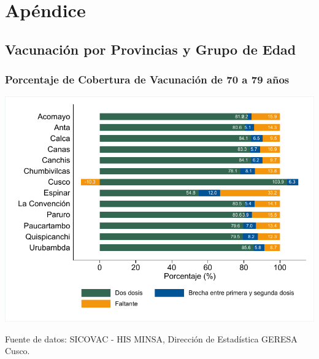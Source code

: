 \documentclass[xcolor=table]{beamer}
\begin{document}
\appendix
\section{Apéndice}

\subsection{Vacunación por Provincias y Grupo de Edad}

\begin{frame}[label=vacunas_70]
	\frametitle{Porcentaje de Cobertura de Vacunación de 70 a 79 años}
	\vspace{-.5cm}
	\begin{center}
		\includegraphics[width=0.8\linewidth, trim={.2cm .5cm .2cm .2cm},clip]{../figuras/vacunacion_provincial_edad_8.pdf}
	\end{center}
	{\tiny Fuente de datos: SICOVAC - HIS MINSA, Dirección de Estadística GERESA Cusco. \\}
\hyperlink{cobertura_vacuna_provincias}{}
\end{frame}
\end{document}
